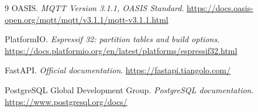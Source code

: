 \documentclass[11pt,a4paper,oneside]{report}
\begin{document}
\begin{thebibliography}{9}
 OASIS. \emph{MQTT Version 3.1.1, OASIS Standard}.
\url{https://docs.oasis-open.org/mqtt/mqtt/v3.1.1/mqtt-v3.1.1.html}

 PlatformIO. \emph{Espressif 32: partition tables and build options}.
\url{https://docs.platformio.org/en/latest/platforms/espressif32.html}

 FastAPI. \emph{Official documentation}.
\url{https://fastapi.tiangolo.com/}

 PostgreSQL Global Development Group. \emph{PostgreSQL documentation}.
\url{https://www.postgresql.org/docs/}
\end{thebibliography}
\end{document}
